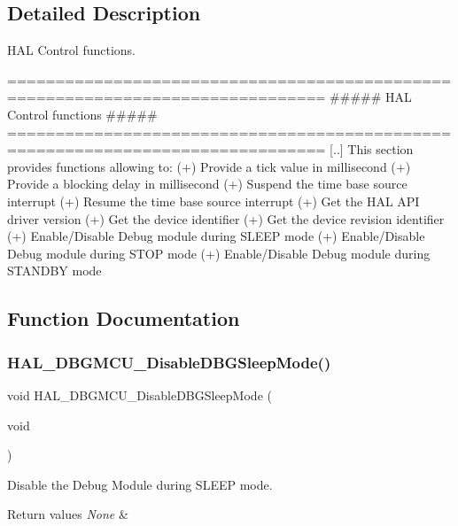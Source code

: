 \subsection{Detailed Description}
H\+AL Control functions. 

\begin{DoxyVerb} ===============================================================================
                      ##### HAL Control functions #####
 ===============================================================================
    [..]  This section provides functions allowing to:
      (+) Provide a tick value in millisecond
      (+) Provide a blocking delay in millisecond
      (+) Suspend the time base source interrupt
      (+) Resume the time base source interrupt
      (+) Get the HAL API driver version
      (+) Get the device identifier
      (+) Get the device revision identifier
      (+) Enable/Disable Debug module during SLEEP mode
      (+) Enable/Disable Debug module during STOP mode
      (+) Enable/Disable Debug module during STANDBY mode\end{DoxyVerb}
 

\subsection{Function Documentation}
\mbox{\label{group___h_a_l___exported___functions___group2_gac7820d0561f19999a68d714655b901b5}} 
\subsubsection{\texorpdfstring{HAL\_DBGMCU\_DisableDBGSleepMode()}{HAL\_DBGMCU\_DisableDBGSleepMode()}}
{\footnotesize\ttfamily void H\+A\+L\+\_\+\+D\+B\+G\+M\+C\+U\+\_\+\+Disable\+D\+B\+G\+Sleep\+Mode (\begin{DoxyParamCaption}\item[{void}]{ }\end{DoxyParamCaption})}



Disable the Debug Module during S\+L\+E\+EP mode. 


\begin{DoxyRetVals}{Return values}
{\em None} & \\
\hline
\end{DoxyRetVals}
\mbox{\label{group___h_a_l___exported___functions___group2_ga7faa58d8508ea3123b9f247a70379779}} 
